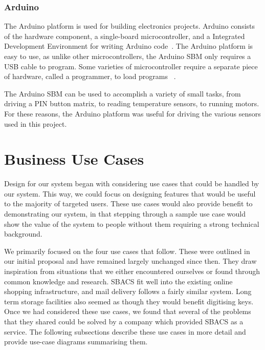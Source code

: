 \documentclass[12pt]{report}
\let\Oldsubsection\subsection
\renewcommand{\subsection}{\FloatBarrier\Oldsubsection}
\begin{document}
\subsection{Arduino} \label{arduino}

The Arduino platform is used for building electronics projects. Arduino consists of the hardware component, a 
single-board microcontroller, and a Integrated Development Environment for writing Arduino code~\autocite{WHATISARDUINO}. 
The Arduino platform is easy to use, as unlike other microcontrollers, the Arduino SBM only requires a USB cable to 
program. Some varieties of microcontroller require a separate piece of hardware, called a programmer, to load programs 
~\autocite{MCUPROGRAMMER}.

The Arduino SBM can be used to accomplish a variety of small tasks, from driving a PIN button matrix, to reading 
temperature sensors, to running motors. For these reasons, the Arduino platform was useful for driving the various 
sensors used in this project.


\chapter{Business Use Cases} \label{business-use-cases}

Design for our system began with considering use cases that could be handled by our system. This way, we could focus on 
designing features that would be useful to the majority of targeted users. These use cases would also provide benefit to demonstrating our system, in that stepping
through a sample use case would show the value of the system to people without them requiring a strong technical
background.


We primarily focused on the four use cases that follow. These were outlined in our initial proposal and have remained
largely unchanged since then. They draw inspiration from situations that we either encountered ourselves or found
through common knowledge and research. SBACS fit well into the existing online shopping infrastructure, and
mail delivery follows a fairly similar system. Long term storage facilities also seemed as though they
would benefit digitising keys. Once we had considered these use cases, we found that several of
the problems that they shared could be solved by a company which provided SBACS as a service. The following subsections
describe these use cases in more detail and provide use-case diagrams summarising them.
\end{document}

